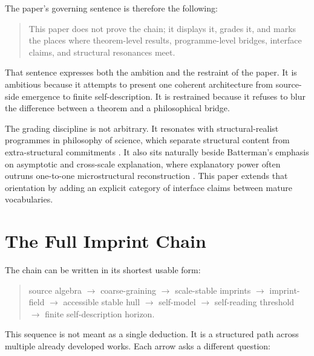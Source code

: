 \documentclass[12pt]{article}
\begin{document}
The paper's governing sentence is therefore the following:

\begin{quote}
This paper does not prove the chain; it displays it, grades it, and marks the places where theorem-level results, programme-level bridges, interface claims, and structural resonances meet.
\end{quote}

That sentence expresses both the ambition and the restraint of the paper. It is ambitious because it attempts to present one coherent architecture from source-side emergence to finite self-description. It is restrained because it refuses to blur the difference between a theorem and a philosophical bridge.

The grading discipline is not arbitrary. It resonates with structural-realist programmes in philosophy of science, which separate structural content from extra-structural commitments \cite{Ladyman2007,French2014}. It also sits naturally beside Batterman's emphasis on asymptotic and cross-scale explanation, where explanatory power often outruns one-to-one microstructural reconstruction \cite{Batterman2002}. This paper extends that orientation by adding an explicit category of interface claims between mature vocabularies.

\section{The Full Imprint Chain}

The chain can be written in its shortest usable form:

\begin{quote}
source algebra $\to$ coarse-graining $\to$ scale-stable imprints $\to$ imprint-field $\to$ accessible stable hull $\to$ self-model $\to$ self-reading threshold $\to$ finite self-description horizon.
\end{quote}

This sequence is not meant as a single deduction. It is a structured path across multiple already developed works. Each arrow asks a different question:
\end{document}
